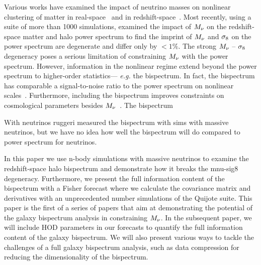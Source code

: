 Various works have examined the impact of neutrino masses on nonlinear clustering 
of matter in real-space~\citep[\emph{e.g.}][]{brandyge2008, saito2008, wong 2008, saito2009, viel2010, agarwal2011} and in 
redshift-space~\citep{marulli2011, castorina2015, upadhye2016}. Most recently, 
using a suite of more than 1000 simulations, \cite{villaescusa-navarro2018} 
examined the impact of $M_\nu$ on the redshift-space matter and halo power 
spectrum to find the imprint of $M_\nu$ and $\sigma_8$ on the power spectrum are 
degenerate and differ only by $< 1\%$. The strong $M_\nu$ -- $\sigma_8$ degeneracy
poses a serious limitation of constraining $M_\nu$ with the power spectrum. 
However, information in the nonlinear regime extend beyond the power spectrum 
to higher-order statistics--- \emph{e.g.} the bispectrum. In fact, the 
bispectrum has comparable a signal-to-noise ratio to the power spectrum
on nonlinear scales~\citep{sefusatti2005, chan2017}. Furthermore, including 
the bispectrum improves constraints on cosmological parameters besides
$M_\nu$~\citep{sefusatti2006, yankelevich2019}. The bispectrum 

With neutrinos ruggeri measured the bispectrum with sims with massive neutrinos, 
but we have no idea how well the bispectrum will do compared to power spectrum 
for neutrinos.

In this paper we use n-body simulations with massive neutrinos to examine the 
redshift-space halo bispectrum and demonstrate how it breaks the mnu-sig8 degeneracy. 
Furthermore, we present the full information content of the bispectrum with a Fisher 
forecast where we calculate the covariance matrix and derivatives with an unprecedented 
number simulations of the Quijote suite. This paper is the first of a series of 
papers that aim at demonstrating the potential of the galaxy bispectrum analysis in 
constraining $M_\nu$. In the subsequent paper, we will include HOD parameters in our 
forecasts to quantify the full information content of the galaxy bispectrum. We will
also present various ways to tackle the challenges of a full galaxy bispectrum analysis, 
such as data compression for reducing the dimensionality of the bispectrum. 

